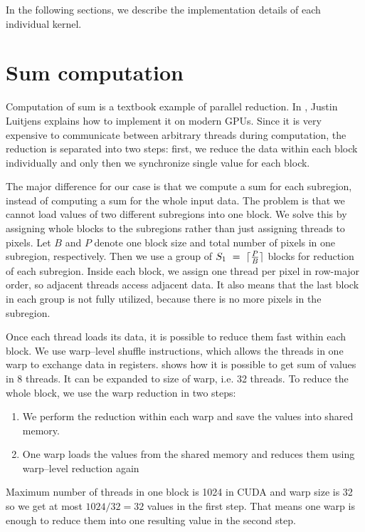 In the following sections, we describe the implementation details of each individual kernel.

\section{Sum computation}
\label{sums}

Computation of sum is a textbook example of parallel reduction. In \cite{parallelReduction}, Justin Luitjens explains how to implement it on modern GPUs. Since it is very expensive to communicate between arbitrary threads during computation, the reduction is separated into two steps: first, we reduce the data within each block individually and only then we synchronize single value for each block.

The major difference for our case is that we compute a sum for each subregion, instead of computing a sum for the whole input data. The problem is that we cannot load values of two different subregions into one block. We solve this by assigning whole blocks to the subregions rather than just assigning threads to pixels. Let $B$ and $P$ denote one block size and total number of pixels in one subregion, respectively. Then we use a group of $S_1~=~\lceil\frac{P}{B}\rceil$ blocks for reduction of each subregion. Inside each block, we assign one thread per pixel in row-major order, so adjacent threads access adjacent data. It also means that the last block in each group is not fully utilized, because there is no more pixels in the subregion.

Once each thread loads its data, it is possible to reduce them fast within each block. We use warp--level shuffle instructions, which allows the threads in one warp to exchange data in registers.  shows how it is possible to get sum of values in 8 threads. It can be expanded to size of warp, i.e. 32 threads. To reduce the whole block, we use the warp reduction in two steps:
\begin{enumerate}
	\item We perform the reduction within each warp and save the values into shared memory.
	\item One warp loads the values from the shared memory and reduces them using warp--level reduction again
\end{enumerate}
Maximum number of threads in one block is 1024 in CUDA and warp size is 32 so we get at most $1024/32 = 32$ values in the first step. That means one warp is enough to reduce them into one resulting value in the second step.


